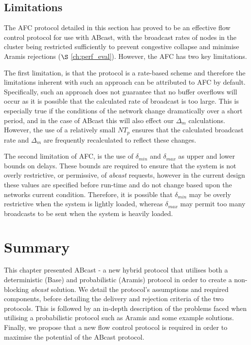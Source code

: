     \subsection{Limitations}
    The AFC protocol detailed in this section has proved to be an effective flow control protocol for use with \textsf{ABcast}, with the broadcast rates of nodes in the cluster being restricted sufficiently to prevent congestive collapse and minimise \textsf{Aramis} rejections ($\S$ \ref{ch:perf_eval}).  However, the AFC has  two key limitations.   
    
    The first limitation, is that the protocol is a rate-based scheme and therefore the limitations inherent with such an approach can be attributed to AFC by default.  Specifically, such an approach does not guarantee that no buffer overflows will occur as it is possible that the calculated rate of broadcast is too large.  This is especially true if the conditions of the network change dramatically over a short period, and in the case of \textsf{ABcast} this will also effect our $\Delta_m$ calculations.  However, the use of a relatively small $NT_p$ ensures that the calculated broadcast rate and $\Delta_m$ are frequently recalculated to reflect these changes.  
    
    The second limitation of AFC, is the use of $\delta_{min}$ and $\delta_{max}$ as upper and lower bounds on delays.  These bounds are required to ensure that the system is not overly restrictive, or permissive, of \emph{abcast} requests, however in the current design these values are specified before run-time and do not change based upon the networks current condition.  Therefore, it is possible that $\delta_{min}$ may be overly restrictive when the system is lightly loaded, whereas $\delta_{max}$ may permit too many broadcasts to be sent when the system is heavily loaded.  

\section{Summary}
This chapter presented \textsf{ABcast} - a new hybrid protocol that utilises both a deterministic (\textsf{Base}) and probabilistic (\textsf{Aramis}) protocol in order to create a non-blocking \emph{abcast} solution.  We detail the protocol's assumptions and required components, before detailing the delivery and rejection criteria of the two protocols.  This is followed by an in-depth description of the problems faced when utilising a probabilistic protocol such as \textsf{Aramis} and some example solutions.  Finally, we propose that a new flow control protocol is required in order to maximise the potential of the \textsf{ABcast} protocol.  
